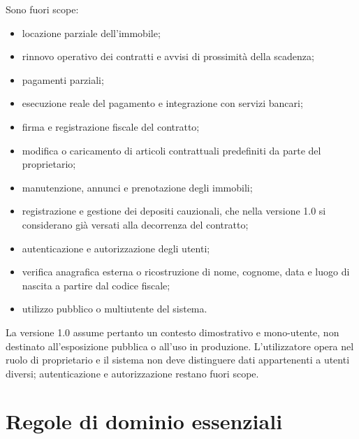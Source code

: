 \documentclass[12pt,a4paper]{article}
\begin{document}
Sono fuori scope:
\begin{itemize}
    \item locazione parziale dell'immobile;
    \item rinnovo operativo dei contratti e avvisi di prossimità della scadenza;
    \item pagamenti parziali;
    \item esecuzione reale del pagamento e integrazione con servizi bancari;
    \item firma e registrazione fiscale del contratto;
    \item modifica o caricamento di articoli contrattuali predefiniti da parte del proprietario;
    \item manutenzione, annunci e prenotazione degli immobili;
    \item registrazione e gestione dei depositi cauzionali, che nella versione 1.0 si considerano già versati alla decorrenza del contratto;
    \item autenticazione e autorizzazione degli utenti;
    \item verifica anagrafica esterna o ricostruzione di nome, cognome, data e luogo di nascita
          a partire dal codice fiscale;
    \item utilizzo pubblico o multiutente del sistema.
\end{itemize}

La versione 1.0 assume pertanto un contesto dimostrativo e mono-utente, non destinato
all'esposizione pubblica o all'uso in produzione. L'utilizzatore opera nel ruolo di proprietario
e il sistema non deve distinguere dati appartenenti a utenti diversi; autenticazione e
autorizzazione restano fuori scope.

\section{Regole di dominio essenziali}
\end{document}
